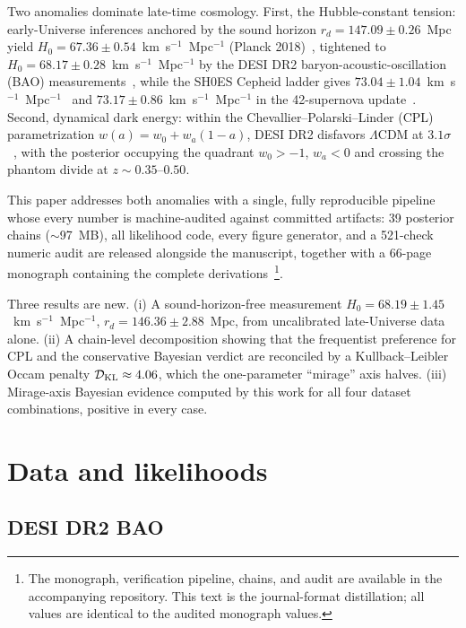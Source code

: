 \documentclass[aps,prd,twocolumn,superscriptaddress,nofootinbib]{revtex4-2}
\begin{document}
Two anomalies dominate late-time cosmology. First, the Hubble-constant tension: early-Universe inferences anchored by the sound horizon $r_d = 147.09 \pm 0.26$~Mpc yield $H_0 = 67.36 \pm 0.54$~km~s$^{-1}$~Mpc$^{-1}$ (Planck 2018)~\cite{Planck2020}, tightened to $H_0 = 68.17 \pm 0.28$~km~s$^{-1}$~Mpc$^{-1}$ by the DESI DR2 baryon-acoustic-oscillation (BAO) measurements~\cite{DESI2025}, while the SH0ES Cepheid ladder gives $73.04 \pm 1.04$~km~s$^{-1}$~Mpc$^{-1}$~\cite{Riess2022} and $73.17 \pm 0.86$~km~s$^{-1}$~Mpc$^{-1}$ in the 42-supernova update~\cite{Riess2024}. Second, dynamical dark energy: within the Chevallier--Polarski--Linder (CPL) parametrization $w(a) = w_0 + w_a(1-a)$, DESI DR2 disfavors $\Lambda$CDM at $3.1\sigma$~\cite{DESI2025,Lodha2025}, with the posterior occupying the quadrant $w_0 > -1$, $w_a < 0$ and crossing the phantom divide at $z \sim 0.35$--$0.50$.

This paper addresses both anomalies with a single, fully reproducible pipeline whose every number is machine-audited against committed artifacts: 39 posterior chains ($\sim$97~MB), all likelihood code, every figure generator, and a 521-check numeric audit are released alongside the manuscript, together with a 66-page monograph containing the complete derivations~\footnote{The monograph, verification pipeline, chains, and audit are available in the accompanying repository. This text is the journal-format distillation; all values are identical to the audited monograph values.}.

Three results are new. (i) A sound-horizon-free measurement $H_0 = 68.19 \pm 1.45$~km~s$^{-1}$~Mpc$^{-1}$, $r_d = 146.36 \pm 2.88$~Mpc, from uncalibrated late-Universe data alone. (ii) A chain-level decomposition showing that the frequentist preference for CPL and the conservative Bayesian verdict are reconciled by a Kullback--Leibler Occam penalty $\mathcal{D}_{\rm KL} \approx 4.06$, which the one-parameter ``mirage'' axis halves. (iii) Mirage-axis Bayesian evidence computed by this work for all four dataset combinations, positive in every case.

\section{Data and likelihoods}
\label{sec:data}

\subsection{DESI DR2 BAO}
\end{document}
